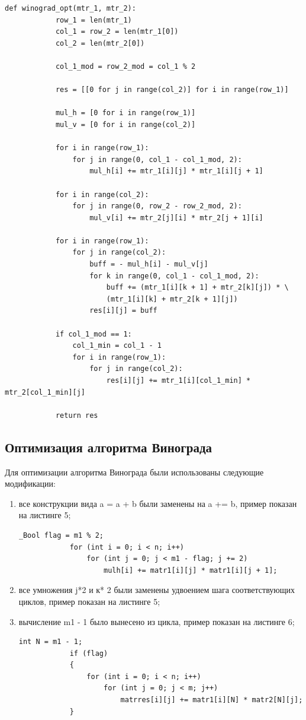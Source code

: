 \documentclass[a4paper, 14pt]{article}
\begin{document}
		\begin{lstlisting}[label=some-code,caption=Оптимизированный алгоритм Винограда]
		def winograd_opt(mtr_1, mtr_2):
    		row_1 = len(mtr_1)
    		col_1 = row_2 = len(mtr_1[0])
    		col_2 = len(mtr_2[0])

    		col_1_mod = row_2_mod = col_1 % 2

    		res = [[0 for j in range(col_2)] for i in range(row_1)]

    		mul_h = [0 for i in range(row_1)]
    		mul_v = [0 for i in range(col_2)]

    		for i in range(row_1):
        		for j in range(0, col_1 - col_1_mod, 2):
            		mul_h[i] += mtr_1[i][j] * mtr_1[i][j + 1]

    		for i in range(col_2):
        		for j in range(0, row_2 - row_2_mod, 2):
            		mul_v[i] += mtr_2[j][i] * mtr_2[j + 1][i]

    		for i in range(row_1):
        		for j in range(col_2):
            		buff = - mul_h[i] - mul_v[j]
            		for k in range(0, col_1 - col_1_mod, 2):
                		buff += (mtr_1[i][k + 1] + mtr_2[k][j]) * \
                        (mtr_1[i][k] + mtr_2[k + 1][j])
            		res[i][j] = buff

    		if col_1_mod == 1:
        		col_1_min = col_1 - 1
        		for i in range(row_1):
            		for j in range(col_2):
                		res[i][j] += mtr_1[i][col_1_min] * mtr_2[col_1_min][j]

    		return res
		\end{lstlisting}
        \subsection{Оптимизация алгоритма Винограда}
        \parindent=1cm
        Для оптимизации алгоритма Винограда были использованы следующие модификации:
        \begin{enumerate}
        	\item все конструкции вида a = a + b были заменены на a += b, пример показан на листинге 5;
		\begin{lstlisting}[label=some-code,caption=Оптимизация 1 и 2]
			_Bool flag = m1 % 2;			
			for (int i = 0; i < n; i++)
				for (int j = 0; j < m1 - flag; j += 2)
					mulh[i] += matr1[i][j] * matr1[i][j + 1];
		\end{lstlisting}   
			\item все умножения j*2 и к* 2 были заменены удвоением шага соответствующих циклов, пример показан на листинге 5; 
			\item вычисление m1 - 1 было вынесено из цикла, пример показан на листинге 6;   
			\begin{lstlisting}[label=some-code,caption=Оптимизация 3]
			int N = m1 - 1;		    
			if (flag)    
			{
				for (int i = 0; i < n; i++)
					for (int j = 0; j < m; j++)
						matrres[i][j] += matr1[i][N] * matr2[N][j];
			}
		\end{lstlisting}   	
        \end{enumerate}
\end{document}
